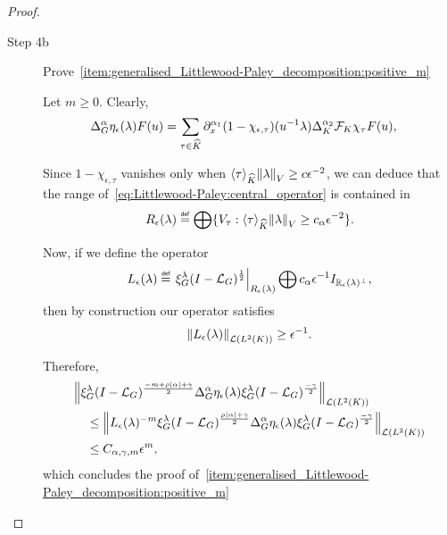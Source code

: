 \begin{proof}
\begin{description}
        \item [Step 4b] Prove~\ref{item:generalised_Littlewood-Paley_decomposition:positive_m}

            Let $m \geq 0$.
            Clearly,
            \begin{align*}
                \DifferenceOperatorOrder \alpha \eta_\epsilon(\lambda) F(u)
                &= \sum_{\tau \in \dualGroup \CompactGroup}
                \iD {x^{\alpha_1} } (1 - \chi_{\epsilon, \tau})(u^{-1} \lambda)
                \DifferenceOperatorOrder [\CompactGroup] {\alpha_2} \Fourier [\CompactGroup] \chi_\tau F(u),
            \end{align*}

            Since $1 - \chi_{\epsilon, \tau}$ vanishes only when $\JapaneseBracket \CompactGroup \tau \norm \lambda \geq c \epsilon^{-2}$,
            we can deduce that the range of~\eqref{eq:Littlewood-Paley:central_operator} is contained in
            \begin{align*}
                R_\epsilon(\lambda) \defeq \bigoplus \{V_\tau : \JapaneseBracket \CompactGroup \tau \norm \lambda \geq c_\alpha \epsilon^{-2} \}.
            \end{align*}

            Now, if we define the operator
            \begin{align*}
                L_\epsilon(\lambda) \defeq \eval {\Rep \lambda \BesselPotential 1} {R_\epsilon(\lambda)} \bigoplus c_\alpha \epsilon^{-1} \Id {\R_\epsilon(\lambda)^\perp},
            \end{align*}
            then by construction our operator satisfies
            \begin{align*}
                \norm [\Lin {\Lebesgue 2 \CompactGroup}] {L_\epsilon(\lambda)} \geq \epsilon^{-1}.
            \end{align*}

            Therefore,
            \begin{align*}
                &\norm [\Lin {\Lebesgue 2 \CompactGroup}] {%
                    \Rep \lambda \BesselPotential {-m + \rho \abs\alpha + \gamma}
                    \DifferenceOperatorOrder \alpha \eta_\epsilon(\lambda)
                    \Rep \lambda \BesselPotential {-\gamma}
                }\\
                &\quad \leq \norm [\Lin {\Lebesgue 2 \CompactGroup}] {%
                    L_\epsilon(\lambda)^{-m}
                    \Rep \lambda \BesselPotential {\rho \abs \alpha + \gamma}
                    \DifferenceOperatorOrder \alpha \eta_\epsilon(\lambda)
                    \Rep \lambda \BesselPotential {-\gamma}
                }\\
                &\quad \leq C_{\alpha, \gamma, m} \epsilon^{m},
            \end{align*}
            which concludes the proof of~\ref{item:generalised_Littlewood-Paley_decomposition:positive_m}
    \end{description}
\end{proof}

